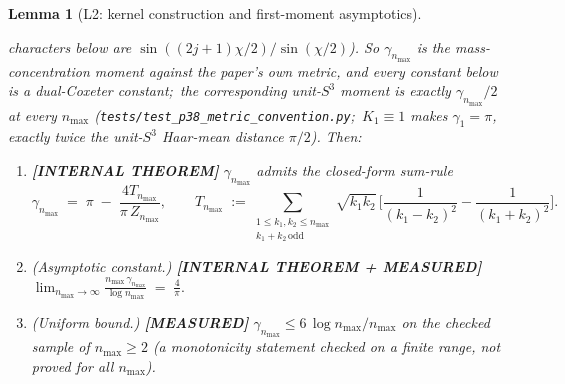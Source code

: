 \documentclass[11pt,a4paper]{article}
\theoremstyle{plain}
\newtheorem{lemma}[theorem]{Lemma}
\theoremstyle{definition}
\newcommand{\nmax}{n_{\max}}
\newcommand{\sthree}{S^{3}}
\newcommand{\KS}{K}
\begin{document}
\begin{lemma}[L2: kernel construction and first-moment asymptotics]
\begin{enumerate}
characters below are $\sin((2j{+}1)\chi/2)/\sin(\chi/2)$).  So
$\gamma_{\nmax}$ is the mass-concentration moment against the paper's
own metric, and every constant below is a dual-Coxeter constant;\ the
corresponding unit-$\sthree$ moment is exactly $\gamma_{\nmax}/2$ at
every $\nmax$ (\texttt{tests/test\_p38\_metric\_convention.py};\
$\KS_1 \equiv 1$ makes $\gamma_1 = \pi$, exactly twice the unit-$\sthree$
Haar-mean distance $\pi/2$).
Then:
\begin{enumerate}\setlength{\itemsep}{1pt}
\item[(d.i)] \textbf{[INTERNAL THEOREM]} $\gamma_{\nmax}$ admits the
closed-form sum-rule
\begin{equation}\label{eq:gamma_sum_rule}
   \gamma_{\nmax}
   \;=\; \pi \;-\; \frac{4 T_{\nmax}}{\pi\,Z_{\nmax}}, \qquad
   T_{\nmax}
   \;:=\!\!\!\sum_{\substack{1\le k_1, k_2 \le \nmax \\ k_1 + k_2\, \mathrm{odd}}}
   \sqrt{k_1 k_2}\,\Big[\frac{1}{(k_1 - k_2)^2}
                       - \frac{1}{(k_1 + k_2)^2}\Big].
\end{equation}
\item[(d.ii)] (Asymptotic constant.) \textbf{[INTERNAL THEOREM +
MEASURED]} $\displaystyle
\lim_{\nmax \to \infty} \frac{\nmax\,\gamma_{\nmax}}{\log \nmax}
\;=\; \frac{4}{\pi}.
$
\item[(d.iii)] (Uniform bound.) \textbf{[MEASURED]}
$\gamma_{\nmax} \le 6\,\log \nmax / \nmax$
on the checked sample of $\nmax \ge 2$ (a monotonicity statement checked
on a finite range, not proved for all $\nmax$).
\end{enumerate}
\end{enumerate}
\end{lemma}
\end{document}
